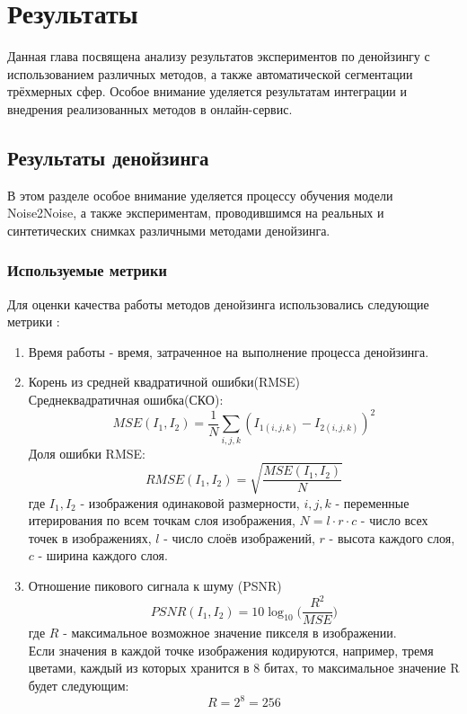 \chapter{Результаты} \label{ch3}
\par Данная глава посвящена анализу результатов экспериментов по денойзингу с использованием различных методов, а также автоматической сегментации трёхмерных сфер. Особое внимание уделяется результатам интеграции и внедрения реализованных методов в онлайн-сервис.
\section{Результаты денойзинга}
\par В этом разделе особое внимание уделяется процессу обучения модели Noise2Noise, а также экспериментам, проводившимся на реальных и синтетических снимках различными методами денойзинга.
\subsection{Используемые метрики}
\par Для оценки качества работы методов денойзинга использовались следующие метрики \cite[с. 6-8]{zhang2019poissongaussian}:
\begin{enumerate}
	\item Время работы - время, затраченное на выполнение процесса денойзинга.
	\item Корень из средней квадратичной ошибки(RMSE)\\
	Среднеквадратичная ошибка(СКО):
	\begin{equation}
		MSE(I_1, I_2) = \frac{1}{N} \sum_{i,j,k}^{}(I_{1(i,j,k)} - I_{2(i,j,k)})^2
	\end{equation}
	Доля ошибки RMSE: 
	\begin{equation}
		RMSE(I_1, I_2) = \sqrt{\frac{MSE(I_1, I_2)}{N}}
	\end{equation}
	где $I_1, I_2$ - изображения одинаковой размерности, $i, j, k$ - переменные итерирования по всем точкам слоя изображения, $N = l \cdot r \cdot c$ - число всех точек в изображениях, $l$ - число слоёв изображений, $r$ - высота каждого слоя, $c$ - ширина каждого слоя.
	\item Отношение пикового сигнала к шуму (PSNR) 
	\begin{equation}
		PSNR(I_1, I_2) = 10\log_{10} \Big(\frac{R^2}{MSE}\Big)
	\end{equation}
	где $R$ - максимальное возможное значение пикселя в изображении.\\
	Если значения в каждой точке изображения кодируются, например, тремя цветами, каждый из которых хранится в 8 битах, то максимальное значение R будет следующим:
	\begin{equation}
		R = 2^8 = 256
	\end{equation}
\end{enumerate}

